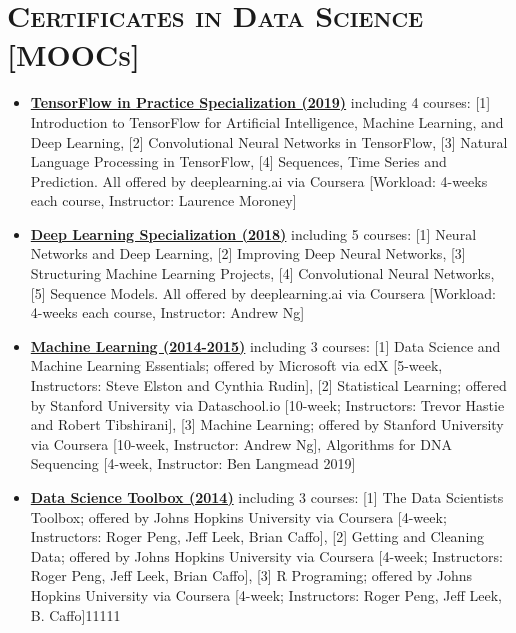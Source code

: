 \documentclass[10pt,a4paper]{moderncv}
\begin{document}
\section{\textsc{Certificates in Data Science [MOOCs]}}

\begin{itemize}
\item \textbf{\href{https://www.coursera.org/specializations/tensorflow-in-practice}{TensorFlow in Practice Specialization (2019)} }including 4 courses: [1] Introduction to TensorFlow for Artificial Intelligence, Machine Learning, and Deep Learning, [2] Convolutional Neural Networks in TensorFlow, [3] Natural Language Processing in TensorFlow, [4] Sequences, Time Series and Prediction. All offered by deeplearning.ai via Coursera [Workload: 4-weeks each course, Instructor: Laurence Moroney]
\vspace{.2cm}

\item \textbf{\href{https://www.coursera.org/specializations/deep-learning}{Deep Learning Specialization (2018)}} including 5 courses: [1] Neural Networks and Deep Learning, [2] Improving Deep Neural Networks, [3] Structuring Machine Learning Projects, [4] Convolutional Neural Networks, [5] Sequence Models. All offered by deeplearning.ai via Coursera [Workload: 4-weeks each course, Instructor: Andrew Ng]
\vspace{.2cm}

\item \textbf{\href{}{Machine Learning (2014-2015)}} including 3 courses: [1] Data Science and Machine Learning Essentials; offered by Microsoft via edX [5-week, Instructors: Steve Elston and Cynthia Rudin], [2] Statistical Learning; offered by Stanford University via Dataschool.io [10-week; Instructors: Trevor Hastie and Robert Tibshirani], [3] Machine Learning; offered by Stanford University via Coursera [10-week, Instructor: Andrew Ng], Algorithms for DNA Sequencing [4-week, Instructor: Ben Langmead 2019]
\vspace{.2cm}

\item \textbf{\href{}{Data Science Toolbox (2014)}} including 3 courses: [1] The Data Scientists Toolbox; offered by Johns Hopkins University via Coursera [4-week; Instructors: Roger Peng, Jeff Leek, Brian Caffo], [2] Getting and Cleaning Data; offered by Johns Hopkins University via Coursera [4-week; Instructors: Roger Peng, Jeff Leek, Brian Caffo], [3] R Programing; offered by Johns Hopkins University via Coursera [4-week; Instructors: Roger Peng, Jeff Leek, B. Caffo]11111

\end{itemize} 
\end{document}
